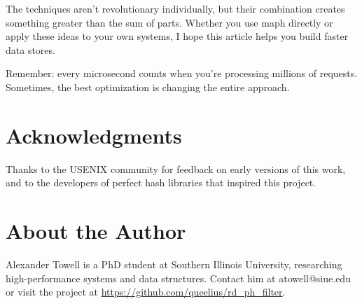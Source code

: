 \documentclass[11pt]{article}
\begin{document}
The techniques aren't revolutionary individually, but their combination creates something greater than the sum of parts. Whether you use maph directly or apply these ideas to your own systems, I hope this article helps you build faster data stores.

Remember: every microsecond counts when you're processing millions of requests. Sometimes, the best optimization is changing the entire approach.

\section*{Acknowledgments}

Thanks to the USENIX community for feedback on early versions of this work, and to the developers of perfect hash libraries that inspired this project.

\section*{About the Author}

Alexander Towell is a PhD student at Southern Illinois University, researching high-performance systems and data structures. Contact him at atowell@siue.edu or visit the project at \url{https://github.com/queelius/rd_ph_filter}.
\end{document}
